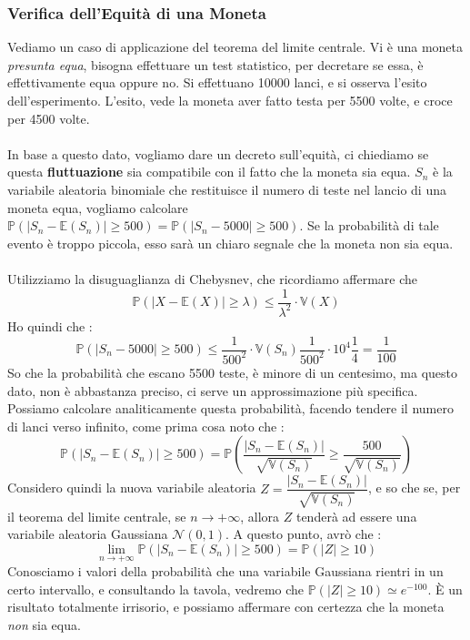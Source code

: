 \documentclass[12pt, letterpaper]{article}
\newcommand{\E}{{\mathbb E}}
\newcommand{\V}{{\mathbb V}}
\newcommand{\acc}{\\\hphantom{}\\}
\newcommand{\Prob}{{\mathbb P}}
\begin{document}
\subsubsection{Verifica dell'Equità di una Moneta}
Vediamo un caso di applicazione del teorema del limite centrale. Vi è una 
moneta \textit{presunta equa}, bisogna effettuare un test statistico, per decretare se essa, è effettivamente 
equa oppure no. Si effettuano 10000 lanci, e si osserva l'esito dell'esperimento. L'esito, vede 
la moneta aver fatto testa per 5500 volte, e croce per 4500 volte.\acc  In base a questo dato, vogliamo 
dare un decreto sull'equità, ci chiediamo se questa \textbf{fluttuazione} sia compatibile con il 
fatto che la moneta sia equa. \(S_n\) è la variabile aleatoria binomiale che restituisce il numero di teste 
nel lancio di una moneta equa, vogliamo calcolare \(\Prob(|S_n-\E(S_n)|\ge 500)=\Prob(|S_n-5000|\ge 500)\).
Se la probabilità di tale evento è troppo piccola, esso sarà un chiaro segnale che la moneta non sia equa.\acc
Utilizziamo la disuguaglianza di Chebysnev, che ricordiamo affermare che $$
\Prob(|X-\E(X)|\ge\lambda)\le \dfrac{1}{\lambda^2}\cdot \V(X)  $$
Ho quindi che :$$
\Prob(|S_n-5000|\ge 500) \le \dfrac{1}{500^2}\cdot \V(S_n) \dfrac{1}{500^2}\cdot 10^4\dfrac{1}{4}=\dfrac{1}{100}$$
So che la probabilità che escano 5500 teste, è minore di un centesimo, ma questo dato, non è abbastanza preciso, ci serve 
un approssimazione più specifica. Possiamo calcolare analiticamente questa probabilità, facendo tendere 
il numero di lanci verso infinito, come prima cosa noto che :$$
\Prob(|S_n-\E(S_n)|\ge 500)=\Prob(\dfrac{|S_n-\E(S_n)|}{\sqrt{\V(S_n)}}\ge \dfrac{500}{\sqrt{\V(S_n)}})$$
Considero quindi la nuova variabile aleatoria \(Z=\dfrac{|S_n-\E(S_n)|}{\sqrt{\V(S_n)}}\), e so che 
se, per il teorema del limite centrale, se \(n\rightarrow +\infty\), allora \(Z\) tenderà ad essere 
una variabile aleatoria Gaussiana \(\mathcal{N}(0,1)\). A questo punto, avrò che :
$$\lim_{n\rightarrow +\infty}\Prob(|S_n-\E(S_n)|\ge 500)=\Prob(|Z|\ge 10)$$
Conosciamo i valori della probabilità che una variabile Gaussiana rientri in un certo intervallo, 
e consultando la tavola, vedremo che \(\Prob(|Z|\ge 10)\simeq e^{-100}\). È un risultato totalmente 
irrisorio, e possiamo affermare con certezza che la moneta \textit{non} sia equa.
\end{document}
